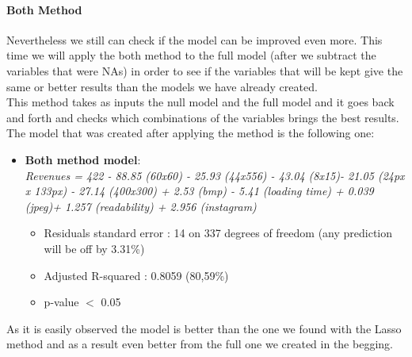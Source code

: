 \documentclass{article}
\begin{document}
\paragraph{Both Method}
Nevertheless we still can check if the model can be improved even more. This time we will apply the both method to the full model (after we subtract the variables that were NAs) in order to see if the variables that will be kept give the same or better results than the models we have already created.\\
This method takes as inputs the null model and the full model and it goes back and forth and checks which combinations of the variables brings the best results. The model that was created after applying the method is the following one:\\
\begin{itemize}
\item \textbf{Both method model}:\\
\textit{Revenues = 422 - 88.85 (60x60) - 25.93 (44x556) - 43.04 (8x15)- 21.05 (24px x 133px) - 27.14 (400x300) + 2.53 (bmp) - 5.41 (loading time) + 0.039 (jpeg)+ 1.257 (readability) + 2.956 (instagram) }
\begin{itemize}
\item Residuals standard error : 14 on 337 degrees of freedom (any prediction will be off by 3.31\%)
\item Adjusted R-squared : 0.8059 (80,59\%)
\item p-value $<$ 0.05
\end{itemize}
\end{itemize}
As it is easily observed the model is better than the one we found with the Lasso method and as a result even better from the full one we created in the begging.
\end{document}
